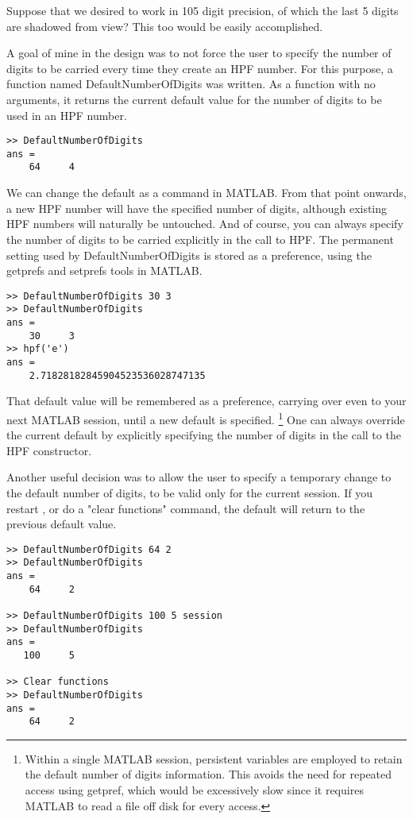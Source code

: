 \documentclass[a4paper,12pt]{article}
\begin{document}
Suppose that we desired to work in 105 digit precision, of which the last 5 digits are shadowed from view? This too would be easily accomplished.

A goal of mine in the design was to not force the user to specify the number of digits to be carried every time they create an HPF number. For this purpose, a function named DefaultNumberOfDigits was written. As a function with no arguments, it returns the current default value for the number of digits to be used in an HPF number.

\begin{lstlisting}
>> DefaultNumberOfDigits
ans =
    64     4
\end{lstlisting}

We can change the default as a command in MATLAB. From that point onwards, a new HPF number will have the specified number of digits, although existing HPF numbers will naturally be untouched. And of course, you can always specify the number of digits to be carried explicitly in the call to HPF. The permanent setting used by DefaultNumberOfDigits is stored as a preference, using the getprefs and setprefs tools in MATLAB.

\begin{lstlisting}
>> DefaultNumberOfDigits 30 3
>> DefaultNumberOfDigits
ans =
    30     3
>> hpf('e')
ans =
    2.71828182845904523536028747135
\end{lstlisting}

That default value will be remembered as a preference, carrying over even to your next MATLAB session, until a new default is specified. \footnote{Within a single MATLAB session, persistent variables are employed to retain the default number of digits information. This avoids the need for repeated access using getpref, which would be excessively slow since it requires MATLAB to read a file off disk for every access.} One can always override the current default by explicitly specifying the number of digits in the call to the HPF constructor.

Another useful decision was to allow the user to specify a temporary change to the default number of digits, to be valid only for the current \Ml session. If you restart \Ml, or do a "clear functions" command, the default will return to the previous default value.

\begin{lstlisting}
>> DefaultNumberOfDigits 64 2
>> DefaultNumberOfDigits
ans =
    64     2

>> DefaultNumberOfDigits 100 5 session
>> DefaultNumberOfDigits
ans =
   100     5

>> Clear functions
>> DefaultNumberOfDigits
ans =
    64     2
\end{lstlisting}
\end{document}
